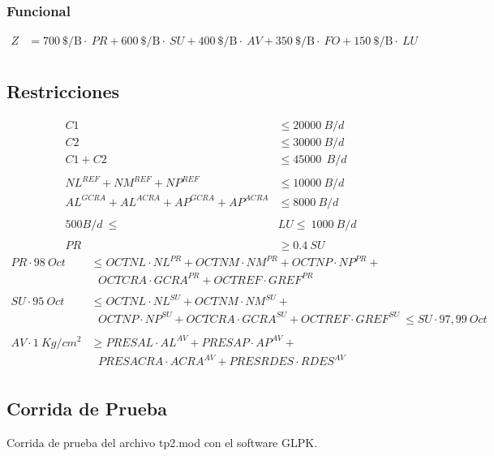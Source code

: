 \documentclass[a4paper,10pt]{article}
\begin{document}
\subsubsection{Funcional}

\begin{align*}
 Z &= 700 \ \text{\$/B} \cdot \ PR + 600\ \text{\$/B} \cdot \ SU + 400\ \text{\$/B} \cdot \ AV + 350\ \text{\$/B} \cdot \ FO + 150\ \text{\$/B} \cdot \ LU \\
\end{align*}

\subsection{Restricciones}

\begin{align*}
 C1 &\leq 20000 \ B/d \\
 C2 &\leq 30000 \ B/d \\
 C1 + C2 &\leq 45000 \ \ B/d \\
 \\
 NL^{REF} + NM^{REF} + NP^{REF} &\leq 10000 \ B/d \\
 AL^{GCRA} + AL^{ACRA} +  AP^{GCRA} + AP^{ACRA} &\leq 8000 \ B/d \\
 \\
  500 B/d \ \leq\ &LU \leq \ 1000 \ B/d \\
 \\
PR &\geq 0.4 \ SU 
 \end{align*}
 \begin{align*}
PR \cdot 98 \ Oct \ &\leq OCTNL \cdot NL^{PR} + OCTNM \cdot NM^{PR} + OCTNP \cdot NP^{PR} +  \\
			& \ \ \ OCTCRA \cdot GCRA^{PR} + OCTREF \cdot GREF^{PR}\\
\\
SU \cdot 95 \ Oct \ &\leq OCTNL \cdot NL^{SU} + OCTNM \cdot NM^{SU} + \\
& \ \ \ OCTNP \cdot NP^{SU} + OCTCRA \cdot GCRA^{SU} + OCTREF \cdot GREF^{SU} \ \leq SU \cdot 97,99 \ Oct  \\
\\
AV \cdot 1 \ Kg/cm^{2} &\geq PRESAL \cdot AL^{AV} + PRESAP \cdot AP^{AV} + \\
				& \ \ \ PRESACRA \cdot ACRA^{AV} + PRESRDES \cdot RDES^{AV}\\
\end{align*}

\subsection{Corrida de Prueba}
Corrida de prueba del archivo tp2.mod con el software GLPK.\\
\end{document}

